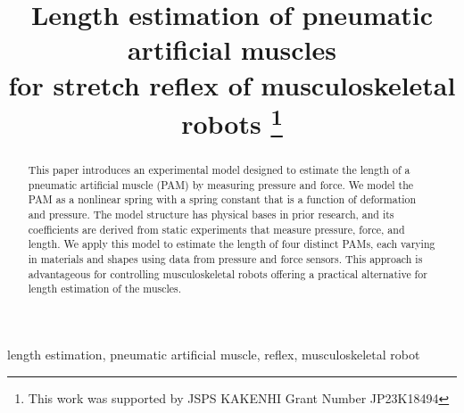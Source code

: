 \documentclass[conference,a4paper,final]{IEEEtran}
\begin{document}
\title{{
Length estimation of pneumatic artificial muscles \\for stretch reflex of musculoskeletal robots}
\thanks{This work was supported by JSPS KAKENHI Grant Number JP23K18494}
}


\author{
\and
{}
}

\maketitle


\begin{abstract}
This paper introduces an experimental model designed to estimate the length of a pneumatic artificial muscle (PAM) by measuring pressure and force. We model the PAM as a nonlinear spring with a spring constant that is a function of deformation and pressure. The model structure has physical bases in prior research, and its coefficients are derived from static experiments that measure pressure, force, and length. We apply this model to estimate the length of four distinct PAMs, each varying in materials and shapes using data from pressure and force sensors. This approach is advantageous for controlling musculoskeletal robots offering a practical alternative for length estimation of the muscles.
\end{abstract}


\begin{IEEEkeywords}
length estimation, pneumatic artificial muscle, reflex, musculoskeletal robot
\end{IEEEkeywords}
\end{document}
